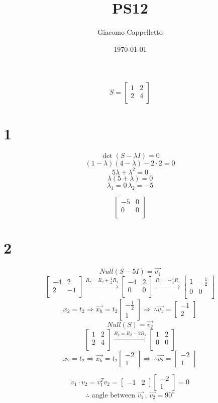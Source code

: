 \documentclass{article}
\title{PS12}
\author{Giacomo Cappelletto}
\date{\today}
\newcommand{\mat}[1]{\begin{bmatrix}#1\end{bmatrix}}
\newcommand{\il}[1]{\[#1\]}
\begin{document}
\maketitle

\il{
  S = 
  \mat{
    1&2\\
    2&4\\
  }
}
\section*{1}

\il{
  \det{(S - \lambda I)} = 0 
}
\il{
   (1 - \lambda)(4 - \lambda) - 2 \cdot 2 = 0
}
\il{
  5 \lambda + \lambda^2 = 0
}
\il{
  \lambda ( 5 + \lambda) = 0
}
\il{
  \lambda_1 = 0 \, \lambda_2 = -5
}

\il{
  \mat{
    -5 & 0\\
    0 & 0\\
  }
}

\section*{2}

\il{
Null(S - 5I) = \vec{v_1}
}
\il{
  \mat{
    -4 & 2\\
    2 & -1\\
  }
  \xrightarrow{R_2 = R_2 + \frac{1}{2} R_1}
  \mat{
    -4 & 2\\
    0 & 0\\
  }
  \xrightarrow{R_1 = -\frac{1}{4} R_1}
  \mat{
    1 & -\frac{1}{2}\\
    0 & 0\\
  }
}
\il{
  x_2 = t_2 \Rightarrow \vec{x_h} = t_2 \mat{-\frac{1}{2} \\ 1} \Rightarrow \, \therefore \vec{v_1} = \mat{-1 \\ 2}
}
\il{
Null(S) = \vec{v_2}
}
\il{
  \mat{
    1 & 2\\
    2 & 4\\
  }
  \xrightarrow{R_2 = R_2 - 2R_1}
  \mat{
    1&2\\
    0&0\\
  }
}
\il{
  x_2 = t_2 \Rightarrow \vec{x_h} = t_2 \mat{-2 \\ 1} \Rightarrow \, \therefore \vec{v_2} = \mat{-2 \\ 1}
}

\il{
  v_1 \cdot v_2 = v_1^T v_2 = \mat{-1 & 2} \mat{-2 \\ 1} = 0
}
\il{
  \therefore \text{ angle between }\vec{v_1} \, , \, \vec{v_2} = 90^{\circ}
}
\end{document}
